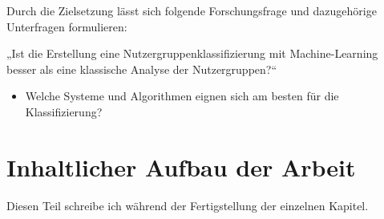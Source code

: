Durch die Zielsetzung lässt sich folgende Forschungsfrage und dazugehörige Unterfragen formulieren:\vspace{0.2cm}

„Ist die Erstellung eine Nutzergruppenklassifizierung mit Machine-Learning besser als eine klassische Analyse der Nutzergruppen?“

\begin{itemize}
	\item Welche Systeme und Algorithmen eignen sich am besten für die Klassifizierung?
\end{itemize}
\section{Inhaltlicher Aufbau der Arbeit}
Diesen Teil schreibe ich während der Fertigstellung der einzelnen Kapitel.
